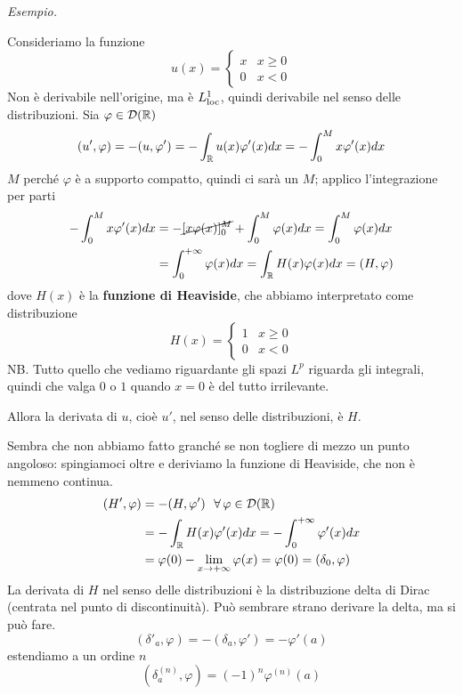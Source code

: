 \textit{Esempio.}

Consideriamo la funzione
\begin{equation*}
u(x) =
\begin{cases}
x & x\geq 0\\
0 & x < 0
\end{cases}
\end{equation*}
Non è derivabile nell'origine, ma è $L^{1}_{\operatorname{loc}}$, quindi derivabile nel senso delle distribuzioni. Sia $\varphi \in \mathcal{D}(\mathbb{R})$
\begin{equation*}
(u', \varphi) = - (u, \varphi') = - \int_{\mathbb{R}} u(x) \varphi'(x) dx = - \int^{M}_{0} x\varphi'(x) dx
\end{equation*}
$M$ perché $\varphi $ è a supporto compatto, quindi ci sarà un $M$; applico l'integrazione per parti
\begin{align*}
- \int^{M}_{0} x\varphi'(x) dx & = - \cancel{[x\varphi (x)]^{M}_{0}} + \int^{M}_{0} \varphi (x) dx = \int^{M}_{0} \varphi (x) dx\\
 & = \int^{+ \infty}_{0} \varphi (x) dx = \int_{\mathbb{R}} H(x) \varphi (x) dx = (H, \varphi)
\end{align*}
dove $H(x)$ è la \textbf{funzione di Heaviside}, che abbiamo interpretato come distribuzione
\begin{equation*}
H(x) =
\begin{cases}
1 & x\geq 0\\
0 & x < 0
\end{cases}
\end{equation*}
NB. Tutto quello che vediamo riguardante gli spazi $L^{p}$ riguarda gli integrali, quindi che valga $0$ o $1$ quando $x = 0$ è del tutto irrilevante.

Allora la derivata di $u$, cioè $u'$, nel senso delle distribuzioni, è $H$.

Sembra che non abbiamo fatto granché se non togliere di mezzo un punto angoloso: spingiamoci oltre e deriviamo la funzione di Heaviside, che non è nemmeno continua.
\begin{align*}
(H', \varphi) & = - (H, \varphi') \ \ \forall \varphi \in \Dc(\RR)\\
 & = - \int_{\RR} H(x) \varphi'(x) dx = - \int^{+ \infty}_{0} \varphi'(x) dx\\
 & = \varphi (0) - \lim_{x\rightarrow + \infty} \varphi (x) = \varphi (0) = (\delta_{0}, \varphi)
\end{align*}
La derivata di $H$ nel senso delle distribuzioni è la distribuzione delta di Dirac (centrata nel punto di discontinuità). Può sembrare strano derivare la delta, ma si può fare.
\begin{equation*}
(\delta'_{a}, \varphi) = - (\delta_{a}, \varphi') = - \varphi'(a)
\end{equation*}
estendiamo a un ordine $n$
\begin{equation*}
\left(\delta^{(n)}_{a}, \varphi \right) = (- 1)^{n} \varphi^{(n)}(a)
\end{equation*}

